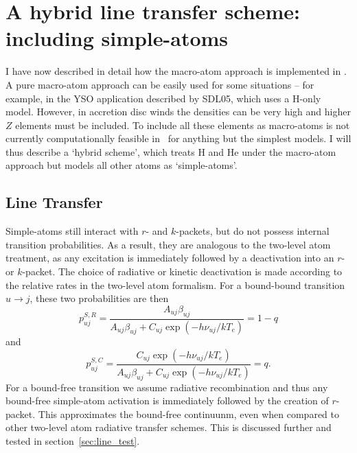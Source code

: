 



\section{A hybrid line transfer scheme: including simple-atoms}

I have now described in detail how the macro-atom approach is 
implemented in \py. A pure macro-atom approach can be easily used for
some situations -- for example, in the YSO application described by 
SDL05, which uses a H-only model. However, in accretion
disc winds the densities can be very high and higher $Z$ elements must be 
included. To include all these elements as macro-atoms is not
currently computationally feasible in \py\ for anything but the simplest
models. I will thus describe a `hybrid scheme', which treats H and He
under the macro-atom approach but models all other atoms 
as `simple-atoms'. 

\subsection{Line Transfer}

Simple-atoms still interact with $r$- and $k$-packets,
but do not possess internal transition probabilities. As a result,
they are analogous to the two-level atom treatment, as any excitation
is immediately followed by a deactivation into an $r$- or $k$-packet.
The choice of radiative or kinetic deactivation is made according 
to the relative rates in the two-level atom formalism. 
For a bound-bound transition $u\rightarrow j$, these two probabilities
are then
\begin{equation}
p_{uj}^{S,R} = \frac{ A_{uj} \beta_{uj} }
{ A_{uj} \beta_{uj} + C_{uj} \exp(-h\nu_{uj} / k T_e) }
= 1 - q
\end{equation}
and
\begin{equation}
p_{uj}^{S,C} = \frac{ C_{uj} \exp(-h\nu_{uj} / k T_e) }
{ A_{uj} \beta_{uj} + C_{uj} \exp(-h\nu_{uj} / k T_e) }
= q.
\end{equation}
For a bound-free transition we assume radiative recombination and 
thus any bound-free simple-atom activation is immediately followed 
by the creation of $r$-packet. This approximates the bound-free continuunm, 
even when compared to other two-level atom radiative transfer schemes. 
This is discussed further and tested in section~\ref{sec:line_test}.

